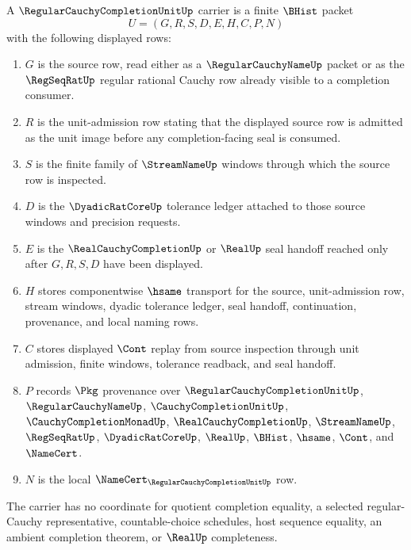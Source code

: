 \begin{definition}
\label{def:regular-cauchy-completion-unit-carrier}
A $\RegularCauchyCompletionUnitUp$ carrier is a finite $\BHist$ packet
$$
U=(G,R,S,D,E,H,C,P,N)
$$
with the following displayed rows:
\begin{enumerate}
\item $G$ is the source row, read either as a $\RegularCauchyNameUp$ packet or as the $\RegSeqRatUp$ regular rational Cauchy row already visible to a completion consumer.
\item $R$ is the unit-admission row stating that the displayed source row is admitted as the unit image before any completion-facing seal is consumed.
\item $S$ is the finite family of $\StreamNameUp$ windows through which the source row is inspected.
\item $D$ is the $\DyadicRatCoreUp$ tolerance ledger attached to those source windows and precision requests.
\item $E$ is the $\RealCauchyCompletionUp$ or $\RealUp$ seal handoff reached only after $G,R,S,D$ have been displayed.
\item $H$ stores componentwise $\hsame$ transport for the source, unit-admission row, stream windows, dyadic tolerance ledger, seal handoff, continuation, provenance, and local naming rows.
\item $C$ stores displayed $\Cont$ replay from source inspection through unit admission, finite windows, tolerance readback, and seal handoff.
\item $P$ records $\Pkg$ provenance over $\RegularCauchyCompletionUnitUp$, $\RegularCauchyNameUp$, $\CauchyCompletionUnitUp$, $\CauchyCompletionMonadUp$, $\RealCauchyCompletionUp$, $\StreamNameUp$, $\RegSeqRatUp$, $\DyadicRatCoreUp$, $\RealUp$, $\BHist$, $\hsame$, $\Cont$, and $\NameCert$.
\item $N$ is the local $\NameCert_{\RegularCauchyCompletionUnitUp}$ row.
\end{enumerate}
The carrier has no coordinate for quotient completion equality, a selected regular-Cauchy representative, countable-choice schedules, host sequence equality, an ambient completion theorem, or $\RealUp$ completeness.
\end{definition}

